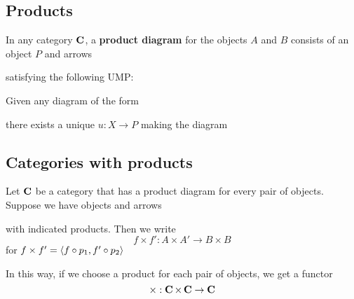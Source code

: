 \documentclass[11pt]{article}
\begin{document}
\subsection{Products}
\label{sec:org3628568}
\begin{definition}[]
In any category \(\operatorname{\textbf{C}}\), a \textbf{product diagram} for the objects \(A\) and \(B\)
consists of an object \(P\) and arrows
\begin{center}\end{center}

satisfying the following UMP:

Given any diagram of the form
\begin{center}\end{center}

there exists a unique \(u:X\to P\) making the diagram
\begin{center}\end{center}
\end{definition}

\subsection{Categories with products}
\label{sec:org92bc992}
Let \(\operatorname{\textbf{C}}\) be a category that has a product diagram for every pair of
objects. Suppose we have objects and arrows
\begin{center}\end{center}
with indicated products. Then we write
\begin{equation*}
f\times f':A\times A'\to B\times B
\end{equation*}
for \(f\times f'=\langle f\circ p_1,f'\circ p_2\rangle\)
\begin{center}\end{center}     In this way, if we choose a product for each
pair of objects, we get a functor
\begin{equation*}
\times:\operatorname{\textbf{C}}\times\operatorname{\textbf{C}}\to\operatorname{\textbf{C}}
\end{equation*}
\end{document}
